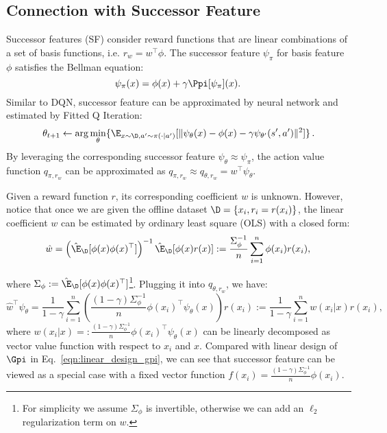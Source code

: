 
\subsection{Connection with Successor Feature}
Successor features (SF) \citep[e.g.,][]{barreto2017successor} consider reward functions that are linear combinations of a set of basis functions, i.e. $r_w = w^\top \phi$.
The successor feature $\psi_\pi$ for basis feature $\phi$ satisfies the Bellman equation:
\begin{equation}\label{eqn:sf_bellman}
    \psi_\pi(x) = \phi(x) + \gamma \Ppi[\psi_\pi](x).\,
\end{equation}
Similar to DQN, successor feature can be approximated by neural network and estimated by Fitted Q Iteration:
$$
\theta_{t+1}\gets \arg\min_{\theta} \{ \E_{x\sim \D, a'\sim \pi(\cdot|a')}[\|\psi_\theta(x) - \phi(x) - \gamma \psi_{\theta'}(s',a')\|^2] \}\,.
$$
By leveraging the corresponding successor feature $\psi_{\theta}\approx \psi_\pi$, the action value function $q_{\pi,r_w}$ can be approximated as $q_{\pi,r_w} \approx q_{\theta,r_w} = w^\top \psi_\theta$.

Given a reward function $r$, its corresponding coefficient $w$ is unknown. However, notice that once we are given the offline dataset $\D = \{x_i, r_i = r(x_i)\}$, the linear coefficient $w$ can be estimated by ordinary least square (OLS) with a closed form:
\begin{equation}\label{eqn:ols_w}
    \hat{w} = \left(\hat{\E}_{\D}[\phi(x)\phi(x)^\top]\right)^{-1} \hat{\E}_{\D}[\phi(x)r(x)]
    := \frac{\Sigma_{\phi}^{-1}}{n} \sum_{i=1}^n \phi(x_i)r(x_i),\,
\end{equation}

where $\Sigma_{\phi} := \hat{\E}_{\D}[\phi(x)\phi(x)^\top]$\footnote{For simplicity we assume $\Sigma_\phi$ is invertible, otherwise we can add an $\ell_2$ regularization term on $w$.}.
Plugging it into $q_{\theta, r_w}$, we have:
\begin{equation}\label{eqn:sf_operator_view}
    \hat{w}^\top \psi_\theta =  \frac{1}{1-\gamma}\sum_{i=1}^n \left(\frac{(1-\gamma)\Sigma_{\phi}^{-1}}{n}\phi(x_i)^\top \psi_\theta(x)\right) r(x_i)
    := \frac{1}{1-\gamma}\sum_{i=1}^n w(x_i|x) r(x_i),\,
\end{equation}
where $w(x_i|x) =: \frac{(1-\gamma)\Sigma_{\phi}^{-1}}{n}\phi(x_i)^\top \psi_\theta(x)$ can be linearly decomposed as vector value function with respect to $x_i$ and $x$.
Compared with linear design of $\Gpi$ in Eq.~\eqref{eqn:linear_design_gpi}, we can see that successor feature can be viewed as a special case with a fixed vector function $f(x_i) = \frac{(1-\gamma)\Sigma_{\phi}^{-1}}{n}\phi(x_i)$.

